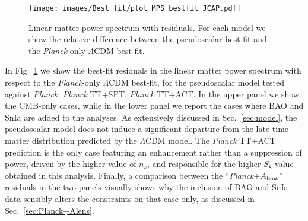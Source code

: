\documentclass[a4paper,11pt]{article}
\begin{document}
 \begin{figure}[tb]
 \centering
 \texttt{[image: images/Best\_fit/plot\_MPS\_bestfit\_JCAP.pdf]}
 \caption{Linear matter power spectrum with residuals. For each model we show the relative difference between the pseudoscalar best-fit and the \emph{Planck}-only $\Lambda$CDM best-fit.}

\label{fig: ResidualMPS}
\end{figure}


In Fig.~\ref{fig: ResidualMPS} we show the best-fit residuals in the linear matter power spectrum with respect to the \textit{Planck}-only $\Lambda$CDM best-fit, for the pseudoscalar model tested against \emph{Planck}, \emph{Planck} TT+SPT, \emph{Planck} TT+ACT. In the upper  panel we show the CMB-only cases, while in the lower panel we report the cases where BAO and SnIa are added to the analyses.
As extensively discussed in Sec.~\ref{sec:model}, the pseudoscalar model does not induce a significant departure from the late-time matter distribution predicted by the $\Lambda$CDM model. The \emph{Planck} TT+ACT prediction is the only case featuring an enhancement rather than a suppression of power, driven by the higher value of $n_s$, and responsible for the higher $S_8$ value obtained in this analysis.
Finally, a comparison between the ``\emph{Planck}+$A_{\rm lens}$'' residuals in the two panels visually shows why the inclusion of BAO and SnIa data sensibly alters the constraints on that case only, as discussed in Sec.~\ref{sec:Planck+Alens}.






\end{document}

